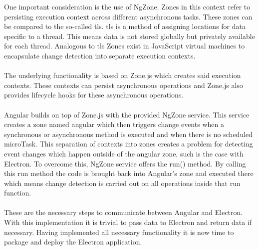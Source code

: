 One important consideration is the use of NgZone. 
Zones in this context refer to persisting execution context across different asynchronous tasks.
These zones can be compared to the so-called \acrfull{tls}.
\acrshort{tls} is a method of assigning locations for data specific to a thread. \parencite{microsoftTls}
This means data is not stored globally but privately available for each thread.
Analogous to \acrshort{tls} Zones exist in JavaScript virtual machines to encapsulate 
change detection into separate execution contexts. \parencite{angularDocsZone}\paragraph{}
The underlying functionality is based on Zone.js which creates said execution contexts.
These contexts can persist asynchronous operations and Zone.js also provides lifecycle hooks 
for these asynchronous operations. \parencite{zoneJs}\paragraph{}
Angular builds on top of Zone.js with the provided NgZone service.
This service creates a zone named angular which then triggers change events when a
synchronous or asynchronous method is executed and when there is no scheduled microTask.
This separation of contexts into zones creates a problem for detecting event changes which 
happen outside of the angular zone, such is the case with Electron.
To overcome this, NgZone service offers the run() method. 
By calling this run method the code is brought back into Angular's zone and executed there 
which means change detection is carried out on all operations inside that run function. \parencite{angularDocsZone}\paragraph{}
These are the necessary steps to communicate between Angular and Electron. 
With this implementation it is trivial to pass data to Electron and return data if necessary. 
Having implemented all necessary functionality it is now time to package and deploy the Electron application.
